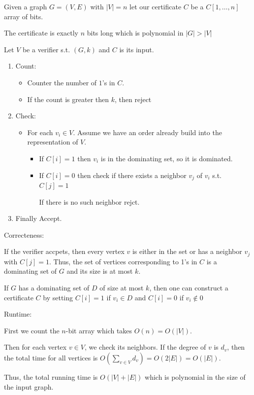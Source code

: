 \documentclass[12pt, letterpaper]{article}
\begin{document}
\begin{problemproof}
    Given a graph $G=(V,E)$ with $|V|=n$ let our certificate $C$ be a $C[1,\dots,n]$ array of bits.

    The certificate is exactly $n$ bits long which is polynomial in $|G|>|V|$

    Let $V$ be a verifier s.t. $(G,k)$ and $C$ is its input.
    \begin{enumerate}
        \item Count:
        \begin{itemize}
            \item Counter the number of $1$'s in $C$.
            \item If the count is greater then $k$, then reject
        \end{itemize}
        \item Check:
        \begin{itemize}
            \item For each $v_i \in V$. Assume we have an order already build into the representation of $V$.
            \begin{itemize}
                \item If $C[i]=1$ then $v_i$ is in the dominating set, so it is dominated.
                \item If $C[i]=0$ then check if there exists a neighbor $v_j$ of $v_i$ s.t. $C[j]=1$
                
                If there is no such neighbor rejct.
            \end{itemize}
        \end{itemize}
        \item Finally Accept.
    \end{enumerate}

    Correcteness:

    If the verifier accpets, then every vertex $v$ is either in the set or has a neighbor $v_j$ with $C[j]=1$. Thus, the set of vertices corresponding to 1's in $C$ is a dominating set of $G$ and its size is at most $k$.

    If $G$ has a dominating set of $D$ of size at most $k$, then one can construct a certificate $C$ by setting $C[i]=1$ if $v_i \in D$ and $C[i]=0$ if $v_i \notin 0$

    Runtime:

    First we count the $n$-bit array which takes $O(n)=O(|V|)$.

    Then for each vertex $v \in V$, we check its neighbors. If the degree of $v$ is $d_v$, then the total time for all vertices is $O(\sum_{v \in V} d_v)=O(2|E|)=O(|E|)$.

    Thus, the total running time is $O(|V|+|E|)$ which is polynomial in the size of the input graph.
\end{problemproof}
\end{document}
